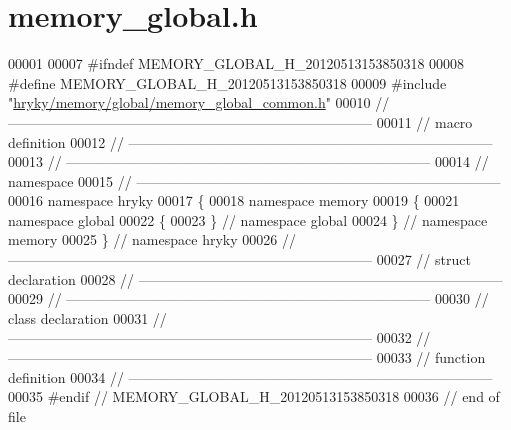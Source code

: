 \hypertarget{memory__global_8h_source}{\section{memory\-\_\-global.\-h}
}

\begin{DoxyCode}
00001 
00007 \textcolor{preprocessor}{#ifndef MEMORY\_GLOBAL\_H\_20120513153850318}
00008 \textcolor{preprocessor}{}\textcolor{preprocessor}{#define MEMORY\_GLOBAL\_H\_20120513153850318}
00009 \textcolor{preprocessor}{}\textcolor{preprocessor}{#include "\hyperlink{memory__global__common_8h}{hryky/memory/global/memory_global_common.h}"}
00010 \textcolor{comment}{//
      ------------------------------------------------------------------------------}
00011 \textcolor{comment}{// macro definition}
00012 \textcolor{comment}{//
      ------------------------------------------------------------------------------}
00013 \textcolor{comment}{//
      ------------------------------------------------------------------------------}
00014 \textcolor{comment}{// namespace}
00015 \textcolor{comment}{//
      ------------------------------------------------------------------------------}
00016 \textcolor{keyword}{namespace }hryky
00017 \{
00018 \textcolor{keyword}{namespace }memory
00019 \{
00021 \textcolor{keyword}{namespace }global
00022 \{
00023 \} \textcolor{comment}{// namespace global}
00024 \} \textcolor{comment}{// namespace memory}
00025 \} \textcolor{comment}{// namespace hryky}
00026 \textcolor{comment}{//
      ------------------------------------------------------------------------------}
00027 \textcolor{comment}{// struct declaration}
00028 \textcolor{comment}{//
      ------------------------------------------------------------------------------}
00029 \textcolor{comment}{//
      ------------------------------------------------------------------------------}
00030 \textcolor{comment}{// class declaration}
00031 \textcolor{comment}{//
      ------------------------------------------------------------------------------}
00032 \textcolor{comment}{//
      ------------------------------------------------------------------------------}
00033 \textcolor{comment}{// function definition}
00034 \textcolor{comment}{//
      ------------------------------------------------------------------------------}
00035 \textcolor{preprocessor}{#endif // MEMORY\_GLOBAL\_H\_20120513153850318}
00036 \textcolor{preprocessor}{}\textcolor{comment}{// end of file}
\end{DoxyCode}
